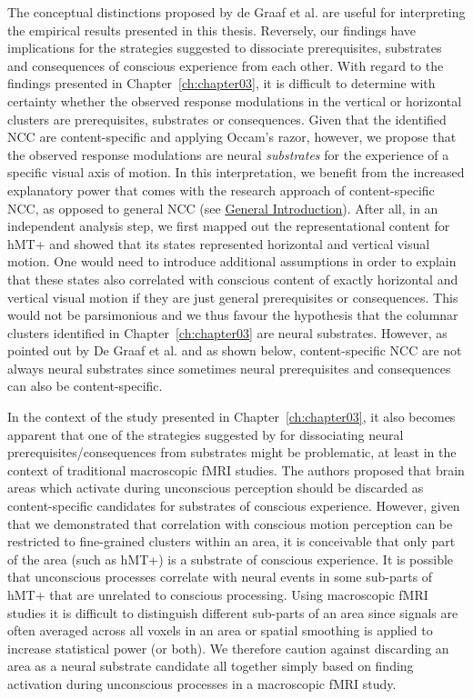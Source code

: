 The conceptual distinctions proposed by de Graaf et al. are useful for interpreting the empirical results presented in this thesis. Reversely, our findings have implications for the strategies suggested to dissociate prerequisites, substrates and consequences of conscious experience from each other. With regard to the findings presented in Chapter~\ref{ch:chapter03}, it is difficult to determine with certainty whether the observed response modulations in the vertical or horizontal clusters are prerequisites, substrates or consequences. Given that the identified NCC are content-specific and applying Occam's razor, however, we propose that the observed response modulations are neural \textit{substrates} for the experience of a specific visual axis of motion. In this interpretation, we benefit from the increased explanatory power that comes with the research approach of content-specific NCC, as opposed to general NCC (see \hyperref[ch:chapter01]{General Introduction}). After all, in an independent analysis step, we first mapped out the representational content for hMT+ and showed that its states represented horizontal and vertical visual motion. One would need to introduce additional assumptions in order to explain that these states also correlated with conscious content of exactly horizontal and vertical visual motion if they are just general prerequisites or consequences. This would not be parsimonious and we thus favour the hypothesis that the columnar clusters identified in Chapter~\ref{ch:chapter03} are neural substrates. However, as pointed out by De Graaf et al. \parencite*{DeGraaf2012} and as shown below, content-specific NCC are not always neural substrates since sometimes neural prerequisites and consequences can also be content-specific.

In the context of the study presented in Chapter~\ref{ch:chapter03}, it also becomes apparent that one of the strategies suggested by \cite{DeGraaf2012} for dissociating neural prerequisites/consequences from substrates might be problematic, at least in the context of traditional macroscopic fMRI studies. The authors proposed that brain areas which activate during unconscious perception should be discarded as content-specific candidates for substrates of conscious experience. However, given that we demonstrated that correlation with conscious motion perception can be restricted to fine-grained clusters within an area, it is conceivable that only part of the area (such as hMT+) is a substrate of conscious experience. It is possible that unconscious processes correlate with neural events in some sub-parts of hMT+ that are unrelated to conscious processing. Using macroscopic fMRI studies it is difficult to distinguish different sub-parts of an area since signals are often averaged across all voxels in an area or spatial smoothing is applied to increase statistical power (or both). We therefore caution against discarding an area as a neural substrate candidate all together simply based on finding activation during unconscious processes in a macroscopic fMRI study.

